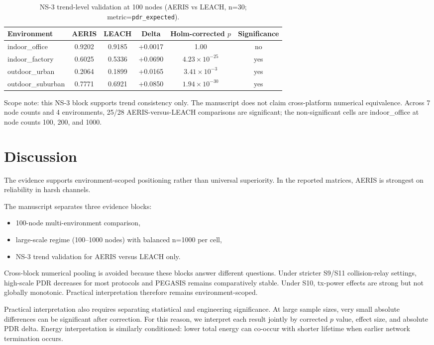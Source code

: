 \documentclass[sensors,article,submit,moreauthors,pdftex]{Definitions/mdpi}
\begin{document}
\begin{table}[H]
\caption{NS-3 trend-level validation at 100 nodes (AERIS vs LEACH, n=30; metric=\texttt{pdr\_expected}).}
\label{tab:ns3_trend}
\centering
\begin{tabular}{lccccc}
\toprule
Environment & AERIS & LEACH & Delta & Holm-corrected $p$ & Significance \\
\midrule
indoor\_office    & 0.9202 & 0.9185 & +0.0017 & 1.00 & no \\
indoor\_factory   & 0.6025 & 0.5336 & +0.0690 & $4.23\times10^{-25}$ & yes \\
outdoor\_urban    & 0.2064 & 0.1899 & +0.0165 & $3.41\times10^{-3}$ & yes \\
outdoor\_suburban & 0.7771 & 0.6921 & +0.0850 & $1.94\times10^{-30}$ & yes \\
\bottomrule
\end{tabular}
\end{table}

Scope note: this NS-3 block supports trend consistency only. The manuscript does not claim cross-platform numerical equivalence. Across 7 node counts and 4 environments, 25/28 AERIS-versus-LEACH comparisons are significant; the non-significant cells are indoor\_office at node counts 100, 200, and 1000.

\section{Discussion}
The evidence supports environment-scoped positioning rather than universal superiority. In the reported matrices, AERIS is strongest on reliability in harsh channels.

The manuscript separates three evidence blocks:
\begin{itemize}
\item 100-node multi-environment comparison,
\item large-scale regime (100--1000 nodes) with balanced n=1000 per cell,
\item NS-3 trend validation for AERIS versus LEACH only.
\end{itemize}
Cross-block numerical pooling is avoided because these blocks answer different questions. Under stricter S9/S11 collision-relay settings, high-scale PDR decreases for most protocols and PEGASIS remains comparatively stable. Under S10, tx-power effects are strong but not globally monotonic. Practical interpretation therefore remains environment-scoped.

Practical interpretation also requires separating statistical and engineering significance. At large sample sizes, very small absolute differences can be significant after correction. For this reason, we interpret each result jointly by corrected $p$ value, effect size, and absolute PDR delta. Energy interpretation is similarly conditioned: lower total energy can co-occur with shorter lifetime when earlier network termination occurs.
\end{document}

